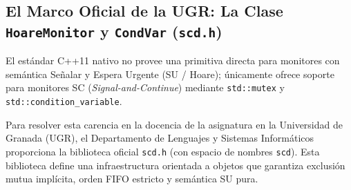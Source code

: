\subsection{El Marco Oficial de la UGR: La Clase \texttt{HoareMonitor} y \texttt{CondVar} (\texttt{scd.h})}
El estándar C++11 nativo no provee una primitiva directa para monitores con semántica Señalar y Espera Urgente (SU / Hoare); únicamente ofrece soporte para monitores SC (\emph{Signal-and-Continue}) mediante \texttt{std::mutex} y \texttt{std::condition\_variable}. 

Para resolver esta carencia en la docencia de la asignatura en la Universidad de Granada (UGR), el Departamento de Lenguajes y Sistemas Informáticos proporciona la biblioteca oficial \texttt{scd.h} (con espacio de nombres \texttt{scd}). Esta biblioteca define una infraestructura orientada a objetos que garantiza exclusión mutua implícita, orden FIFO estricto y semántica SU pura.

